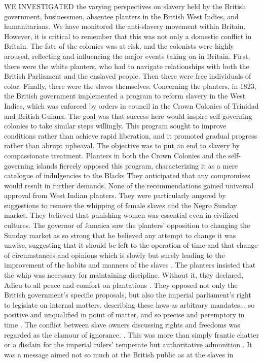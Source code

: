 WE INVESTIGATED the varying perspectives on slavery held by the British government, businessmen, absentee planters in the British West Indies, and humanitarians. We have monitored the anti-slavery movement within Britain. However, it is critical to remember that this was not only a domestic conflict in Britain. The fate of the colonies was at risk, and the colonists were highly aroused, reflecting and influencing the major events taking on in Britain. First, there were the white planters, who had to navigate relationships with both the British Parliament and the enslaved people. Then there were free individuals of color. Finally, there were the slaves themselves. Concerning the planters, in 1823, the British government implemented a program to reform slavery in the West Indies, which was enforced by orders in council in the Crown Colonies of Trinidad and British Guiana. The goal was that success here would inspire self-governing colonies to take similar steps willingly. This program sought to improve conditions rather than achieve rapid liberation, and it promoted gradual progress rather than abrupt upheaval. The objective was to put an end to slavery by compassionate treatment. Planters in both the Crown Colonies and the self-governing islands fiercely opposed this program, characterizing it as a mere catalogue of indulgencies to the Blacks  They anticipated that any compromises would result in further demands. None of the recommendations gained universal approval from West Indian planters. They were particularly angered by suggestions to remove the whipping of female slaves and the Negro Sunday market. They believed that punishing women was essential even in civilized cultures. The governor of Jamaica saw the planters' opposition to changing the Sunday market as so strong that he believed any attempt to change it was unwise, suggesting that it should be left to the operation of time and that change of circumstances and opinions which is slowly but surely leading to the improvement of the habits and manners of the slaves . The planters insisted that the whip was necessary for maintaining discipline. Without it, they declared, Adieu to all peace and comfort on plantations . They opposed not only the British government's specific proposals, but also the imperial parliament's right to legislate on internal matters, describing these laws as arbitrary mandates... so positive and unqualified in point of matter, and so precise and peremptory in time . The conflict between slave owners discussing rights and freedoms was regarded as the clamour of ignorance. . This was more than simply frantic chatter or a disdain for the imperial rulers' temperate but authoritative admonition . It was a message aimed not so much at the British public as at the slaves in 